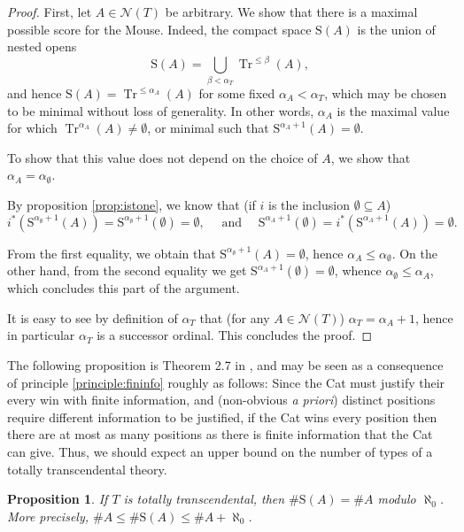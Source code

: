 \documentclass{article}
\newtheorem{prop}[theorem]{Proposition}
\theoremstyle{nonumberplain}
\newtheorem{proof}{Proof}
\newcommand{\calN}{\mathcal{N}}
\newcommand{\Stone}{\mathrm{S}}
\DeclareMathOperator{\Tr}{Tr}
\begin{document}
\begin{proof}
First, let $A \in \calN(T)$ be arbitrary. We show that there is a maximal possible score for the Mouse. Indeed, the compact space $\Stone(A)$ is the union of nested opens
\begin{equation}
\Stone(A) = \bigcup_{\beta < \alpha_T} \Tr^{\leq \beta}(A),
\end{equation}
and hence $\Stone(A) = \Tr^{\leq\alpha_A}(A)$ for some fixed $\alpha_A < \alpha_T$, which may be chosen to be minimal without loss of generality. In other words, $\alpha_A$ is the maximal value for which $\Tr^{\alpha_A}(A) \neq \emptyset$, or minimal such that $\Stone^{\alpha_A + 1}(A) = \emptyset$.

To show that this value does not depend on the choice of $A$, we show that $\alpha_A = \alpha_\emptyset$.

By proposition \ref{prop:istone}, we know that (if $i$ is the inclusion $\emptyset \subseteq A$)
\begin{equation}
i^*(\Stone^{\alpha_\emptyset + 1}(A)) = \Stone^{\alpha_\emptyset + 1}(\emptyset) = \emptyset, \quad \text{ and } \quad \Stone^{\alpha_A + 1}(\emptyset) = i^*(\Stone^{\alpha_A + 1}(A)) = \emptyset.
\end{equation}

From the first equality, we obtain that $\Stone^{\alpha_\emptyset + 1}(A) = \emptyset$, hence $\alpha_A \leq \alpha_\emptyset$. On the other hand, from the second equality we get $\Stone^{\alpha_A + 1}(\emptyset) = \emptyset$, whence $\alpha_\emptyset \leq \alpha_A$, which concludes this part of the argument.

It is easy to see by definition of $\alpha_T$ that (for any $A \in \calN(T)$) $\alpha_T = \alpha_A + 1$, hence in particular $\alpha_T$ is a successor ordinal. This concludes the proof.
\end{proof}

The following proposition is Theorem 2.7 in \cite{morley}, and may be seen as a consequence of principle \ref{principle:fininfo} roughly as follows: Since the Cat must justify their every win with finite information, and (non-obvious \textit{a priori}) distinct positions require different information to be justified, if the Cat wins every position then there are at most as many positions as there is finite information that the Cat can give. Thus, we should expect an upper bound on the number of types of a totally transcendental theory.

\begin{prop}
If $T$ is totally transcendental, then $\# \Stone(A) = \# A$ modulo $\aleph_0$. More precisely, $\# A \leq \# \Stone(A) \leq \# A + \aleph_0$.
\end{prop}
\end{document}
